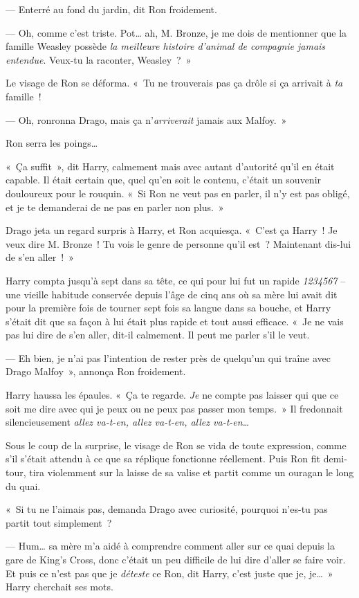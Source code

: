 --- Enterré au fond du jardin, dit Ron froidement.

--- Oh, comme c'est triste. Pot… ah, M. Bronze, je me dois de mentionner que la famille Weasley possède \emph{la meilleure histoire d'animal de compagnie jamais entendue}. Veux-tu la raconter, Weasley~?~»

Le visage de Ron se déforma.  «~Tu ne trouverais pas ça drôle si ça arrivait à \emph{ta} famille~!

--- Oh, ronronna Drago, mais ça n'\emph{arriverait} jamais aux Malfoy.~»

Ron serra les poings…

«~Ça suffit~», dit Harry, calmement mais avec autant d'autorité qu'il en était capable.
Il était certain que, quel qu'en soit le contenu, c'était un souvenir douloureux pour le rouquin.
«~Si Ron ne veut pas en parler, il n'y est pas obligé, et je te demanderai de ne pas en parler non plus.~»

Drago jeta un regard surpris à Harry, et Ron acquiesça.
«~C'est ça Harry~! Je veux dire M. Bronze~! Tu vois le genre de personne qu'il est~? Maintenant dis-lui de s'en aller~!~»

Harry compta jusqu'à sept dans sa tête, ce qui pour lui fut un rapide \emph{1234567} -- une vieille habitude conservée depuis l'âge de cinq ans où sa mère lui avait dit pour la première fois de tourner sept fois sa langue dans sa bouche, et Harry s'était dit que sa façon à lui était plus rapide et tout aussi efficace. «~Je ne vais pas lui dire de s'en aller, dit-il calmement. Il peut me parler s'il le veut.

--- Eh bien, je n'ai pas l'intention de rester près de quelqu'un qui traîne avec Drago Malfoy~», annonça Ron froidement.

Harry haussa les épaules. «~Ça te regarde. \emph{Je} ne compte pas laisser qui que ce soit me dire avec qui je peux ou ne peux pas passer mon temps.~»
Il fredonnait silencieusement \emph{allez va-t-en, allez va-t-en, allez va-t-en…}

Sous le coup de la surprise, le visage de Ron se vida de toute expression, comme s'il s'était attendu à ce que sa réplique fonctionne réellement.
Puis Ron fit demi-tour, tira violemment sur la laisse de sa valise et partit comme un ouragan le long du quai.

«~Si tu ne l'aimais pas, demanda Drago avec curiosité, pourquoi n'es-tu pas partit tout simplement~?

--- Hum… sa mère m'a aidé à comprendre comment aller sur ce quai depuis la gare de King's Cross, donc c'était un peu difficile de lui dire d'aller se faire voir.
Et puis ce n'est pas que je \emph{déteste} ce Ron, dit Harry, c'est juste que je, je…~» Harry cherchait ses mots.

